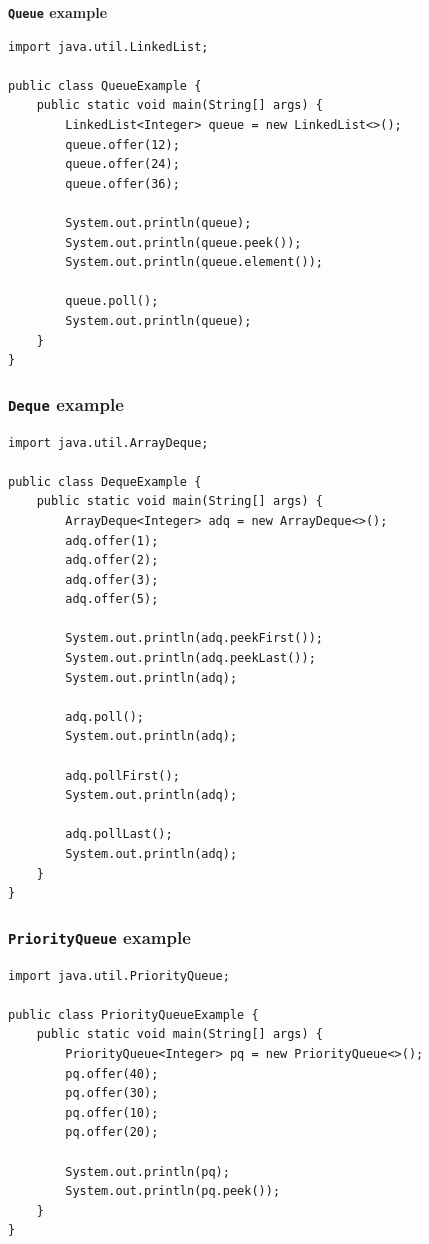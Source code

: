 \documentclass{book}
\begin{document}
\textbf{\texttt{Queue} example}

\begin{verbatim}
import java.util.LinkedList;

public class QueueExample {
    public static void main(String[] args) {
        LinkedList<Integer> queue = new LinkedList<>();
        queue.offer(12);
        queue.offer(24);
        queue.offer(36);

        System.out.println(queue);
        System.out.println(queue.peek());
        System.out.println(queue.element());

        queue.poll();
        System.out.println(queue);
    }
}
\end{verbatim}

\subsubsection{\texttt{Deque} example}

\begin{verbatim}
import java.util.ArrayDeque;

public class DequeExample {
    public static void main(String[] args) {
        ArrayDeque<Integer> adq = new ArrayDeque<>();
        adq.offer(1);
        adq.offer(2);
        adq.offer(3);
        adq.offer(5);

        System.out.println(adq.peekFirst());
        System.out.println(adq.peekLast());
        System.out.println(adq);

        adq.poll();
        System.out.println(adq);

        adq.pollFirst();
        System.out.println(adq);

        adq.pollLast();
        System.out.println(adq);
    }
}
\end{verbatim}

\subsubsection{\texttt{PriorityQueue} example}

\begin{verbatim}
import java.util.PriorityQueue;

public class PriorityQueueExample {
    public static void main(String[] args) {
        PriorityQueue<Integer> pq = new PriorityQueue<>();
        pq.offer(40);
        pq.offer(30);
        pq.offer(10);
        pq.offer(20);

        System.out.println(pq);
        System.out.println(pq.peek());
    }
}
\end{verbatim}
\end{document}
